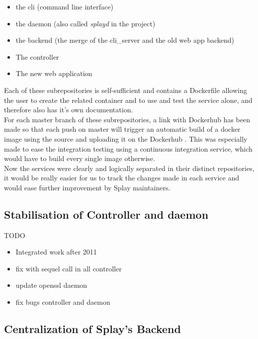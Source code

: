 \documentclass{eplmastersthesis}
\begin{document}
        \begin{itemize}
          \item the cli (command line interface)
          \item the daemon (also called \textit{splayd} in the project)
          \item the backend (the merge of the cli\_server and the old web app backend)
          \item The controller
          \item The new web application
        \end{itemize}

        Each of these subrepositories is self-sufficient and contains a Dockerfile
        allowing the user to create the related container and to use and test
        the service alone, and therefore also has it's own documentation.\\

        For each master branch of these subrepositories, a link with Dockerhub
        has been made so that each push on master will trigger an automatic build
        of a docker image using the source and uploading it on the Dockerhub \cite{DockerHubGithub}.
        This was especially made to ease the integration testing using a
        continuous integration service, which would have to build every single
        image otherwise.\\

        Now the services were clearly and logically separated in their
        distinct repositories, it would be really easier for us to track
        the changes made in each service and would ease further improvement
        by Splay maintainers.

      \subsection{Stabilisation of Controller and daemon}
        {\color{red} TODO}
        \begin{itemize}
          \item Integrated work after 2011
          \item fix with sequel call in all controller
          \item update openssl daemon
          \item fix bugs controller and daemon
        \end{itemize}

      \subsection{Centralization of Splay's Backend}
\end{document}
